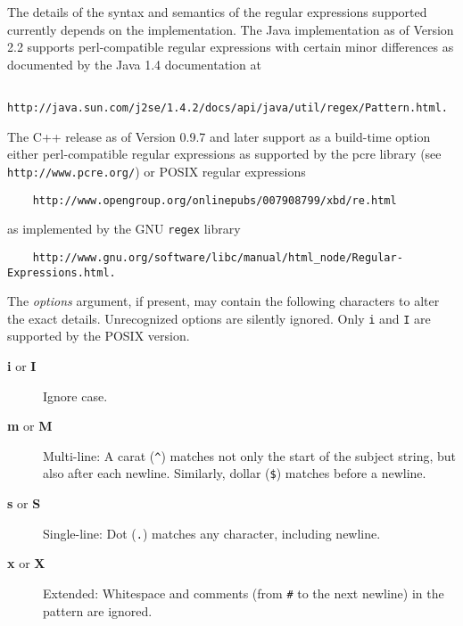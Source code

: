 \documentclass{article}
\begin{document}
\begin{description}
The details of the syntax and semantics of the regular expressions supported
currently depends on the implementation.  The Java implementation as of Version
2.2 supports perl-compatible regular expressions with certain minor differences
as documented by the Java 1.4 documentation at
\begin{verbatim}    http://java.sun.com/j2se/1.4.2/docs/api/java/util/regex/Pattern.html.  \end{verbatim}
The C++ release as of Version 0.9.7 and later support as a build-time option either
perl-compatible regular expressions as supported by the pcre library
(see \verb|http://www.pcre.org/|) or POSIX regular expressions
\begin{verbatim}    http://www.opengroup.org/onlinepubs/007908799/xbd/re.html\end{verbatim}
as implemented by the GNU \verb|regex| library
\begin{verbatim}    http://www.gnu.org/software/libc/manual/html_node/Regular-Expressions.html.\end{verbatim}

The \emph{options} argument, if present, may contain the following characters
to alter the exact details.   Unrecognized options are silently ignored.
Only \verb|i| and \verb|I| are supported by the POSIX version.

\begin{description}

\item[\textbf{i} or \textbf{I}]
\mbox{}

Ignore case.

\item[\textbf{m} or \textbf{M}]
\mbox{}

Multi-line:  A carat (\verb|^|) matches not only the start of the subject
string, but also after each newline.  Similarly, dollar (\verb|$|) matches
before a newline.
\item[\textbf{s} or \textbf{S}]
\mbox{}

Single-line:  Dot (\verb|.|) matches any character, including newline.

\item[\textbf{x} or \textbf{X}]
\mbox{}

Extended:  Whitespace and comments (from \verb|#| to the next newline) in
the pattern are ignored.

\end{description}


\end{description}
\end{document}
